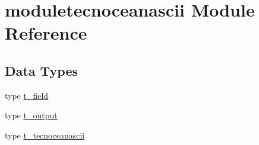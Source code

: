 \hypertarget{namespacemoduletecnoceanascii}{}\section{moduletecnoceanascii Module Reference}
\label{namespacemoduletecnoceanascii}
\subsection*{Data Types}
\begin{DoxyCompactItemize}
\item 
type \mbox{\hyperlink{structmoduletecnoceanascii_1_1t__field}{t\+\_\+field}}
\item 
type \mbox{\hyperlink{structmoduletecnoceanascii_1_1t__output}{t\+\_\+output}}
\item 
type \mbox{\hyperlink{structmoduletecnoceanascii_1_1t__tecnoceanascii}{t\+\_\+tecnoceanascii}}
\end{DoxyCompactItemize}
